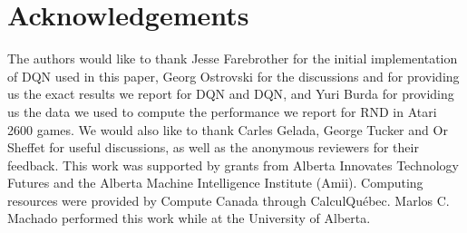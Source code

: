 \documentclass[letterpaper]{article} \usepackage{aaai20}  \usepackage{times}  \usepackage{helvet} \usepackage{courier}  \usepackage[hyphens]{url}  \usepackage{graphicx} \urlstyle{rm} \def\UrlFont{\rm}  \usepackage{graphicx}  \frenchspacing  \setlength{\pdfpagewidth}{8.5in}  \setlength{\pdfpageheight}{11in}  \usepackage{booktabs}
\begin{document}
\section*{Acknowledgements}

The authors would like to thank Jesse Farebrother for the initial implementation of DQN used in this paper, Georg Ostrovski for the discussions and for providing us the exact results we report for \textsc{DQN} and \textsc{DQN}, and Yuri Burda for providing us the data we used to compute the performance we report for RND in Atari 2600 games. We would also like to thank Carles Gelada, George Tucker and Or Sheffet for useful discussions, as well as the anonymous reviewers for their feedback. This work was supported by grants from Alberta Innovates Technology Futures and the Alberta Machine Intelligence Institute (Amii). Computing resources were provided by Compute Canada through CalculQu\'ebec. Marlos C. Machado performed this work while at the University of Alberta.



\end{document}
